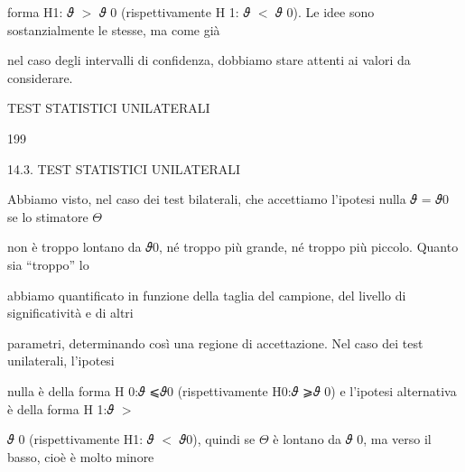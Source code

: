 \documentclass[a4paper,portrait,12pt]{article}
\begin{document}
\begin{flushleft}
forma H1: 𝜗 $>$ 𝜗 0 (rispettivamente H 1: 𝜗 $<$ 𝜗 0). Le idee sono sostanzialmente le stesse, ma come gi\`{a}
\end{flushleft}


\begin{flushleft}
nel caso degli intervalli di confidenza, dobbiamo stare attenti ai valori da considerare.
\end{flushleft}





\begin{flushleft}
 TEST STATISTICI UNILATERALI
\end{flushleft}





199





\begin{flushleft}
14.3. TEST STATISTICI UNILATERALI
\end{flushleft}


\begin{flushleft}
Abbiamo visto, nel caso dei test bilaterali, che accettiamo l'ipotesi nulla 𝜗 = 𝜗0 se lo stimatore $\Theta$
\end{flushleft}


\begin{flushleft}
non \`{e} troppo lontano da 𝜗0, n\'{e} troppo più grande, n\'{e} troppo più piccolo. Quanto sia {``}troppo'' lo
\end{flushleft}


\begin{flushleft}
abbiamo quantificato in funzione della taglia del campione, del livello di significativit\`{a} e di altri
\end{flushleft}


\begin{flushleft}
parametri, determinando così una regione di accettazione. Nel caso dei test unilaterali, l'ipotesi
\end{flushleft}


\begin{flushleft}
nulla \`{e} della forma H 0:𝜗 ⩽𝜗0 (rispettivamente H0:𝜗 ⩾𝜗 0) e l'ipotesi alternativa \`{e} della forma H 1:𝜗 $>$
\end{flushleft}


\begin{flushleft}
𝜗 0 (rispettivamente H1: 𝜗 $<$ 𝜗0), quindi se $\Theta$ \`{e} lontano da 𝜗 0, ma verso il basso, cio\`{e} \`{e} molto minore
\end{flushleft}
\end{document}

